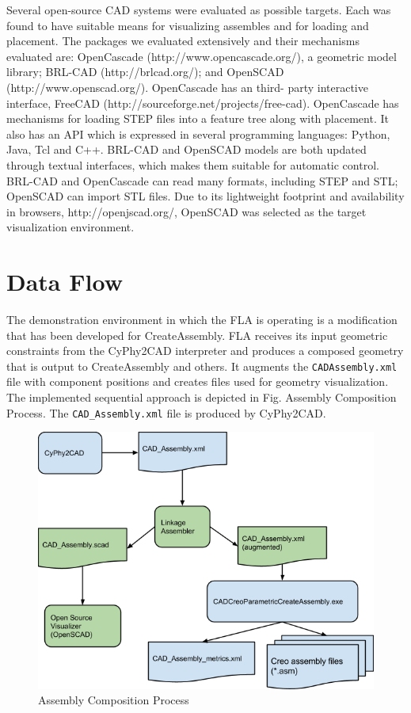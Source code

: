 \documentclass[]{report}
\begin{document}
Several open-source CAD systems were evaluated as possible targets.  
Each was found to have suitable means for visualizing assembles and for loading and placement. 
The packages we evaluated extensively and their mechanisms evaluated are: 
OpenCascade (http://www.opencascade.org/), a geometric model library; 
BRL-CAD (http://brlcad.org/); and OpenSCAD (http://www.openscad.org/). 
OpenCascade has an third- party interactive interface, 
FreeCAD (http://sourceforge.net/projects/free-cad). 
OpenCascade has mechanisms for loading STEP files into a feature tree along with placement. 
It also has an API which is expressed in several programming languages: 
Python, Java, Tcl and C++. BRL-CAD and OpenSCAD models are both updated 
through textual interfaces, which makes them suitable for automatic control.  
BRL-CAD and OpenCascade can read many formats, including STEP and STL; 
OpenSCAD can import STL files.  
Due to its lightweight footprint and availability in browsers, 
http://openjscad.org/, OpenSCAD was selected as the target visualization environment.

\section{Data Flow}

The demonstration environment in which the FLA is operating is 
a modification that has been developed for CreateAssembly. 
FLA receives its input geometric constraints from the CyPhy2CAD 
interpreter and produces a composed geometry that is output to CreateAssembly and others.  
It augments the \texttt{CADAssembly.xml} file with component positions 
and creates files used for geometry visualization. 
The implemented sequential approach is depicted in Fig. Assembly Composition Process. 
The \texttt{CAD\_Assembly.xml} file is produced by CyPhy2CAD.  

\begin{figure}[h!]
	\centering
	\includegraphics[scale=0.7]{images/image13}
	\caption{Assembly Composition Process}
	\label{fig:assy-compose}
\end{figure}
\end{document}
